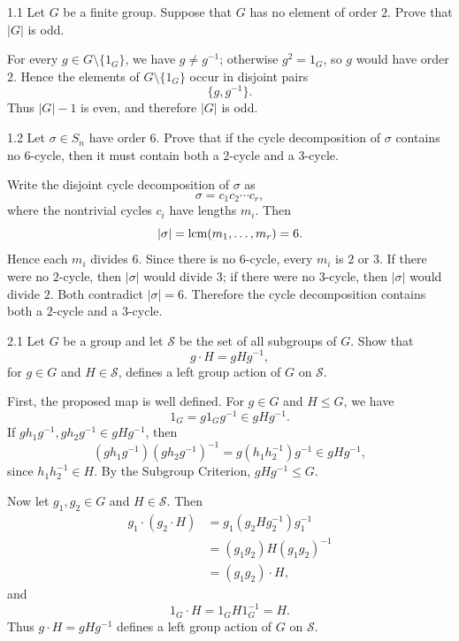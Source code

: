 \documentclass[11pt,oneside]{article}
\begin{document}

\begin{problem}{1.1}
Let $G$ be a finite group. Suppose that $G$ has no element of order $2$. Prove that $|G|$ is odd.
\end{problem}

\begin{solution}
For every $g\in G\setminus\{1_G\}$, we have $g\neq g^{-1}$; otherwise $g^2=1_G$, so $g$ would have order $2$. Hence the elements of $G\setminus\{1_G\}$ occur in disjoint pairs
\[
    \{g,g^{-1}\}.
\]
Thus $|G|-1$ is even, and therefore $|G|$ is odd.
\end{solution}

\begin{problem}{1.2}
Let $\sigma\in S_n$ have order $6$. Prove that if the cycle decomposition of $\sigma$ contains no $6$-cycle, then it must contain both a $2$-cycle and a $3$-cycle.
\end{problem}

\begin{solution}
Write the disjoint cycle decomposition of $\sigma$ as
\[
    \sigma=c_1c_2\cdots c_r,
\]
where the nontrivial cycles $c_i$ have lengths $m_i$. Then
\[
    |\sigma|=\operatorname{lcm}(m_1,\ldots,m_r)=6.
\]
Hence each $m_i$ divides $6$. Since there is no $6$-cycle, every $m_i$ is $2$ or $3$. If there were no $2$-cycle, then $|\sigma|$ would divide $3$; if there were no $3$-cycle, then $|\sigma|$ would divide $2$. Both contradict $|\sigma|=6$. Therefore the cycle decomposition contains both a $2$-cycle and a $3$-cycle.
\end{solution}

\begin{problem}{2.1}
Let $G$ be a group and let $\mathcal S$ be the set of all subgroups of $G$. Show that
\[
    g\cdot H=gHg^{-1},
\]
for $g\in G$ and $H\in\mathcal S$, defines a left group action of $G$ on $\mathcal S$.
\end{problem}

\begin{solution}
First, the proposed map is well defined. For $g\in G$ and $H\le G$, we have
\[
    1_G=g1_Gg^{-1}\in gHg^{-1}.
\]
If $gh_1g^{-1},gh_2g^{-1}\in gHg^{-1}$, then
\[
    (gh_1g^{-1})(gh_2g^{-1})^{-1}
    =g(h_1h_2^{-1})g^{-1}\in gHg^{-1},
\]
since $h_1h_2^{-1}\in H$. By the Subgroup Criterion, $gHg^{-1}\le G$.

Now let $g_1,g_2\in G$ and $H\in\mathcal S$. Then
\[
\begin{aligned}
    g_1\cdot(g_2\cdot H)
    &=g_1(g_2Hg_2^{-1})g_1^{-1}\\
    &=(g_1g_2)H(g_1g_2)^{-1}\\
    &=(g_1g_2)\cdot H,
\end{aligned}
\]
and
\[
    1_G\cdot H=1_GH1_G^{-1}=H.
\]
Thus $g\cdot H=gHg^{-1}$ defines a left group action of $G$ on $\mathcal S$.
\end{solution}
\end{document}
